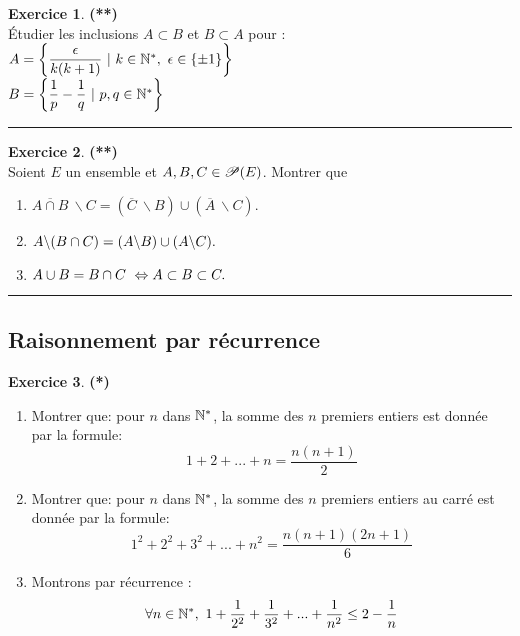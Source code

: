 \documentclass[a4paper,11pt]{article}
\theoremstyle{definition}
\newtheorem{exo}{Exercice} %
\begin{document}
\begin{minipage}{1\linewidth}
	\begin{minipage}[t]{0.48\linewidth}
		\raggedright
		
		\begin{exo}\textbf{(**)}\quad\\[0.2cm]
		Étudier les inclusions $A \subset B$ et $B \subset A$ pour :\\[0.2cm]
		$A = \left\{\dfrac{\epsilon}{k(k+1)} \ | \ k\in\N^*,\ \epsilon\in\{\pm1\}\right\}$\\[0.2cm]
		$B = \left\{\dfrac{1}{p} - \dfrac{1}{q}\ | \ p,q\in\N^*\right\}$

			\centering
			\rule{1\linewidth}{0.6pt}
		\end{exo}
	\begin{exo}\textbf{(**)}\quad\\[0.2cm]
		
		Soient $E$ un ensemble et $A, B, C \in \mathscr{P} (E)$. Montrer que 
		\begin{enumerate}
			\item $ \overline{A\cap B}~\backslash C = \left(\overline{C}~\backslash B\right) \cup \left(\overline{A}~\backslash C\right).$
			\item $A \backslash(B \cap C) = (A \backslash B) \cup( A \backslash C ).$
			\item $A \cup B = B \cap C  \ \Leftrightarrow A\subset B\subset C.$
		\end{enumerate}
	
		
		\centering
		\rule{1\linewidth}{0.6pt}
	\end{exo}
	\subsection*{Raisonnement par récurrence}
	
\begin{exo}\textbf{(*)}\quad\\[0.2cm]	
	
	\begin{enumerate}
		\item Montrer que: pour $n$ dans $\mathbb{N}^*$, la somme des $n$ premiers entiers est donnée par la formule:
		$$1 + 2 + ... + n =
		\dfrac{n(n + 1)
		}{2}$$
		\item Montrer que: pour $n$ dans $\mathbb{N}^*$, la somme des $n$ premiers entiers au carré est donnée par la formule:
		$$1^2 + 2^2 + 3^2 +... + n^2 =
		\dfrac{n(n + 1)(2n+1)
		}{6}$$ 
		\item Montrons par récurrence :
		$$\forall n \in \mathbb{N}^*, \ 1+ \dfrac{1}{2^2}+\dfrac{1}{3^2} + ...+ \dfrac{1}{n^2} \leq 2 - \dfrac{1}{n}$$\hfil\\
	\end{enumerate}


\end{exo}
\end{minipage}
\end{minipage}
\end{document}
